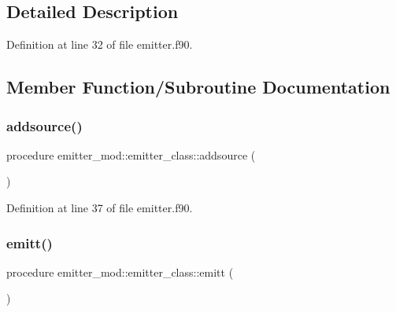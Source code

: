 \subsection{Detailed Description}


Definition at line 32 of file emitter.\+f90.



\subsection{Member Function/\+Subroutine Documentation}
\mbox{\label{structemitter__mod_1_1emitter__class_a162685b7b0bf96b555fee37e129c9783}} 
\subsubsection{\texorpdfstring{addsource()}{addsource()}}
{\footnotesize\ttfamily procedure emitter\+\_\+mod\+::emitter\+\_\+class\+::addsource (\begin{DoxyParamCaption}{ }\end{DoxyParamCaption})\hspace{0.3cm}{\ttfamily [private]}}



Definition at line 37 of file emitter.\+f90.

\mbox{\label{structemitter__mod_1_1emitter__class_ac33721448c01508a8e8c486cd7a76b65}} 
\subsubsection{\texorpdfstring{emitt()}{emitt()}}
{\footnotesize\ttfamily procedure emitter\+\_\+mod\+::emitter\+\_\+class\+::emitt (\begin{DoxyParamCaption}{ }\end{DoxyParamCaption})\hspace{0.3cm}{\ttfamily [private]}}



